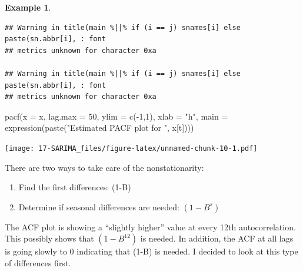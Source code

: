 \documentclass[
]{book}
\newenvironment{Shaded}{\begin{snugshade}}{\end{snugshade}}
\newcommand{\AttributeTok}[1]{\textcolor[rgb]{0.77,0.63,0.00}{#1}}
\newcommand{\DecValTok}[1]{\textcolor[rgb]{0.00,0.00,0.81}{#1}}
\newcommand{\FunctionTok}[1]{\textcolor[rgb]{0.00,0.00,0.00}{#1}}
\newcommand{\NormalTok}[1]{#1}
\newcommand{\SpecialCharTok}[1]{\textcolor[rgb]{0.00,0.00,0.00}{#1}}
\newcommand{\StringTok}[1]{\textcolor[rgb]{0.31,0.60,0.02}{#1}}
\providecommand{\tightlist}{%
  \setlength{\itemsep}{0pt}\setlength{\parskip}{0pt}}
\theoremstyle{definition}
\theoremstyle{definition}
\newtheorem{example}{Example}[chapter]
\theoremstyle{definition}
\theoremstyle{definition}
\theoremstyle{remark}
\begin{document}
\begin{example}
\begin{verbatim}
## Warning in title(main %||% if (i == j) snames[i] else paste(sn.abbr[i], : font
## metrics unknown for character 0xa

## Warning in title(main %||% if (i == j) snames[i] else paste(sn.abbr[i], : font
## metrics unknown for character 0xa
\end{verbatim}

\begin{Shaded}
\begin{Highlighting}[]
\FunctionTok{pacf}\NormalTok{(}\AttributeTok{x =}\NormalTok{ x, }\AttributeTok{lag.max =} \DecValTok{50}\NormalTok{, }\AttributeTok{ylim =} \FunctionTok{c}\NormalTok{(}\SpecialCharTok{{-}}\DecValTok{1}\NormalTok{,}\DecValTok{1}\NormalTok{), }\AttributeTok{xlab =} \StringTok{"h"}\NormalTok{, }
    \AttributeTok{main =} \FunctionTok{expression}\NormalTok{(}\FunctionTok{paste}\NormalTok{(}\StringTok{"Estimated PACF plot for "}\NormalTok{, }
\NormalTok{    x[t])))}
\end{Highlighting}
\end{Shaded}

\texttt{[image: 17-SARIMA\_files/figure-latex/unnamed-chunk-10-1.pdf]}

There are two ways to take care of the nonstationarity:

\begin{enumerate}
\def\labelenumi{\arabic{enumi}.}
\tightlist
\item
  Find the first differences: (1-B)
\item
  Determine if seasonal differences are needed: \((1-B^s)\)
\end{enumerate}

The ACF plot is showing a ``slightly higher'' value at every 12th autocorrelation. This possibly shows that \((1-B^{12})\) is needed. In addition, the ACF at all lags is going slowly to 0 indicating that (1-B) is needed. I decided to look at this type of differences first.


\end{example}
\end{document}
